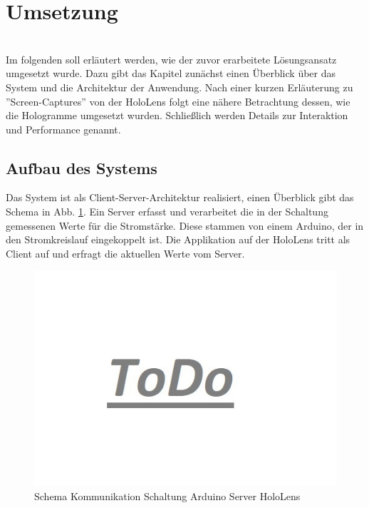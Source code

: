 \section{Umsetzung}
\label{sec-5}
\\

Im folgenden soll erläutert werden, wie der zuvor erarbeitete Lösungsansatz umgesetzt wurde. Dazu gibt das Kapitel zunächst einen Überblick über das System und die Architektur der Anwendung. Nach einer kurzen Erläuterung zu ''Screen-Captures'' von der HoloLens folgt eine nähere Betrachtung dessen, wie die Hologramme umgesetzt wurden. Schließlich werden Details zur Interaktion und Performance genannt.

\subsection{Aufbau des Systems}
Das System ist als Client-Server-Architektur realisiert, einen Überblick gibt das Schema in Abb. \ref{img:communication-schema}. Ein Server erfasst und verarbeitet die in der Schaltung gemessenen Werte für die Stromstärke. Diese stammen von einem Arduino, der in den Stromkreislauf eingekoppelt ist. Die Applikation auf der HoloLens tritt als Client auf und erfragt die aktuellen Werte vom Server. 
\begin{figure}[H]
	\centering
	\includegraphics[width=1\textwidth]{images/todo.jpg}
	\caption{Schema Kommunikation Schaltung Arduino Server HoloLens}
	\label{img:communication-schema}
\end{figure}

